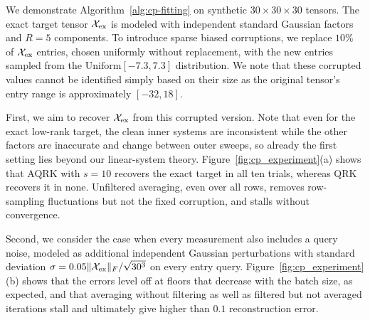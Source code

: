 \documentclass[pdflatex,sn-mathphys-num]{sn-jnl}
\theoremstyle{thmstyleone}
\theoremstyle{thmstylethree}
\begin{document}
We demonstrate Algorithm~\ref{alg:cp-fitting} on synthetic 
$30\times30\times30$ tensors. The exact target tensor
$\mathcal X_{\rm ex}$ is modeled with independent standard Gaussian factors and $R = 5$ components. To introduce sparse biased corruptions, we replace $10\%$ of $\mathcal X_{\rm ex}$ entries, chosen uniformly without replacement, with the new entries sampled from the $\mathrm{Uniform}[-7.3,7.3]$ distribution. We note that these corrupted values cannot be identified simply based on their size as the original tensor's entry range is
approximately $[-32,18]$.


First, we aim to recover $\mathcal X_{\rm ex}$ from this corrupted version. Note that even for the exact low-rank target, the clean inner systems are inconsistent while the other factors are inaccurate and change between outer sweeps, so already the first setting lies beyond our linear-system theory. Figure~\ref{fig:cp_experiment}(a) shows that AQRK with $s=10$ recovers the exact target in all ten trials, whereas QRK
recovers it in none. Unfiltered averaging, even over all rows, removes
row-sampling fluctuations but not the fixed corruption, and stalls without convergence.

Second, we consider the case when every measurement also includes a  query noise, modeled as additional independent Gaussian perturbations with standard deviation
$\sigma=0.05\|\mathcal X_{\rm ex}\|_F/\sqrt{30^3}$ on every entry query.
Figure~\ref{fig:cp_experiment}(b) shows that
the errors level off at floors that decrease with the batch size, as
expected, and that averaging without filtering as well as filtered but not averaged iterations stall and ultimately give higher than $0.1$ reconstruction error.
\end{document}
